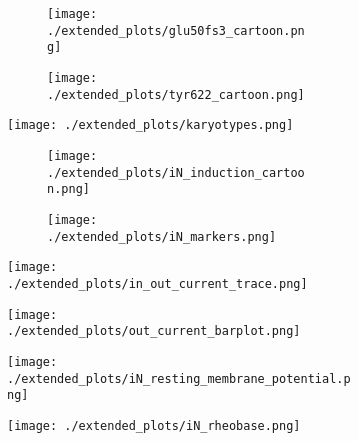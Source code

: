 \begin{figure}[H]
    \begin{subfigure}[t]{0.3\textwidth}
        \begin{subfigure}[t]{\textwidth}
            \caption{}
            \texttt{[image: ./extended\_plots/glu50fs3\_cartoon.png]}        
        \end{subfigure}    
        \begin{subfigure}[t]{\textwidth}
            \caption{}
            \texttt{[image: ./extended\_plots/tyr622\_cartoon.png]}        
        \end{subfigure}  
    \end{subfigure}  
    \begin{subfigure}[t]{0.2\textwidth}
        \caption{}
        \texttt{[image: ./extended\_plots/karyotypes.png]}        
    \end{subfigure}  
    \begin{subfigure}[t]{0.4\textwidth}
        \begin{subfigure}[t]{\textwidth}
            \caption{}
            \texttt{[image: ./extended\_plots/iN\_induction\_cartoon.png]}        
        \end{subfigure}    
        \begin{subfigure}[t]{\textwidth}
            \caption{}
            \texttt{[image: ./extended\_plots/iN\_markers.png]}        
        \end{subfigure}  
    \end{subfigure}    
    \begin{subfigure}[t]{0.33\textwidth}
        \caption{}
        \texttt{[image: ./extended\_plots/in\_out\_current\_trace.png]}        
    \end{subfigure}  
    \begin{subfigure}[t]{0.33\textwidth}
        \caption{}
        \texttt{[image: ./extended\_plots/out\_current\_barplot.png]}        
    \end{subfigure}  
    \begin{subfigure}[t]{0.25\textwidth}
        \caption{}
        \texttt{[image: ./extended\_plots/iN\_resting\_membrane\_potential.png]}        
    \end{subfigure}  
    \begin{subfigure}[t]{0.25\textwidth}
        \caption{}
        \texttt{[image: ./extended\_plots/iN\_rheobase.png]}        

\end{subfigure}
\end{figure}
